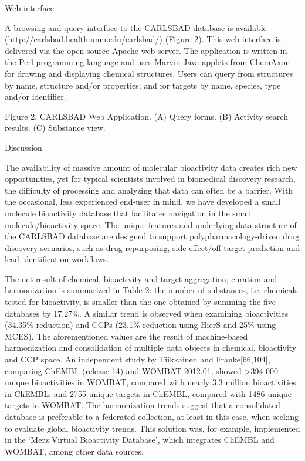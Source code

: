 Web interface

A browsing and query interface to the CARLSBAD database is available (http://carlsbad.health.unm.edu/carlsbad/) (Figure 2). This web interface is delivered via the open source Apache web server. The application is written in the Perl programming language and uses Marvin Java applets from ChemAxon for drawing and displaying chemical structures. Users can query from structures by name, structure and/or properties; and for targets by name, species, type and/or identifier.

Figure 2.
CARLSBAD Web Application. (A) Query forms. (B) Activity search results. (C) Substance view.

Discussion

The availability of massive amount of molecular bioactivity data creates rich new opportunities, yet for typical scientists involved in biomedical discovery research, the difficulty of processing and analyzing that data can often be a barrier. With the occasional, less experienced end-user in mind, we have developed a small molecule bioactivity database that facilitates navigation in the small molecule/bioactivity space. The unique features and underlying data structure of the CARLSBAD database are designed to support polypharmacology-driven drug discovery scenarios, such as drug repurposing, side effect/off-target prediction and lead identification workflows.

The net result of chemical, bioactivity and target aggregation, curation and harmonization is summarized in Table 2: the number of substances, i.e. chemicals tested for bioactivity, is smaller than the one obtained by summing the five databases by 17.27\%. A similar trend is observed when examining bioactivities (34.35\% reduction) and CCPs (23.1\% reduction using HierS and 25\% using MCES). The aforementioned values are the result of machine-based harmonization and consolidation of multiple data objects in chemical, bioactivity and CCP space. An independent study by Tiikkainen and Franke[66,104], comparing ChEMBL (release 14) and WOMBAT 2012.01, showed >394 000 unique bioactivities in WOMBAT, compared with nearly 3.3 million bioactivities in ChEMBL; and 2755 unique targets in ChEMBL, compared with 1486 unique targets in WOMBAT. The harmonization trends suggest that a consolidated database is preferable to a federated collection, at least in this case, when seeking to evaluate global bioactivity trends. This solution was, for example, implemented in the ‘Merz Virtual Bioactivity Database’, which integrates ChEMBL and WOMBAT, among other data sources.

